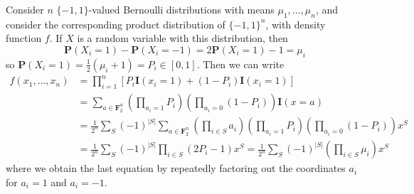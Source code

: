 \begin{example}
    Consider $n$ $\{ -1, 1 \}$-valued Bernoulli distributions with means $\mu_1, \dots, \mu_n$, and consider the corresponding product distribution of $\{ -1, 1 \}^n$, with density function $f$. If $X$ is a random variable with this distribution, then
    \[ \mathbf{P}(X_i = 1) - \mathbf{P}(X_i = -1) = 2 \mathbf{P}(X_i = 1) - 1 = \mu_i \]
    so $\mathbf{P}(X_i = 1) = \frac{1}{2} (\mu_i + 1) = P_i \in [0,1]$. Then we can write
    \begin{align*}
        f(x_1, \dots, x_n) &= \prod_{i = 1}^n \left[ P_i \mathbf{I}(x_i = 1) + (1 - P_i) \mathbf{I}(x_i = 1) \right]\\
        &= \sum_{a \in \mathbf{F}_2^n} \left( \prod_{a_i = 1} P_i \right) \left( \prod_{a_i = 0} (1 - P_i) \right) \mathbf{I}(x = a)\\
        &= \frac{1}{2^n} \sum_S (-1)^{|S|} \sum_{a \in \mathbf{F}_2^n} \left( \prod_{i \in S} a_i \right) \left( \prod_{a_i = 1} P_i \right) \left( \prod_{a_i = 0} (1 - P_i) \right) x^S\\
        &= \frac{1}{2^n} \sum_S (-1)^{|S|} \prod_{i \in S} (2P_i - 1) x^S = \frac{1}{2^n} \sum_S (-1)^{|S|} \left( \prod_{i \in S} \mu_i \right) x^S
    \end{align*}
    where we obtain the last equation by repeatedly factoring out the coordinates $a_i$ for $a_i = 1$ and $a_i = -1$.
\end{example}

